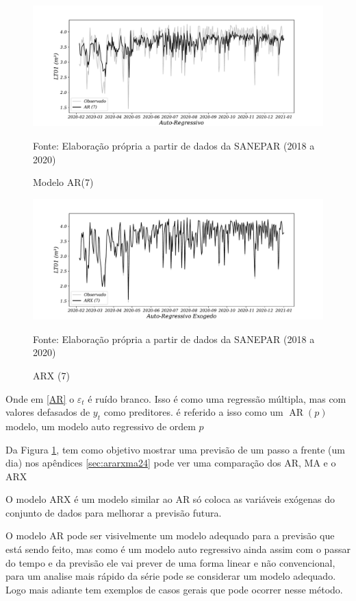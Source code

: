\begin{figure}[H]
	\centering
	\caption{Modelo AR(7)  }
	\label{fig:1-ar}
	\includegraphics[width=1\linewidth]{Modelos/Figuras/0-AR}
	
	Fonte: Elaboração própria a partir de dados da SANEPAR (2018 a 2020)
\end{figure}

\begin{figure}[H]
	\centering
	\caption{ARX (7)}
	\label{fig:1-arx}
	\includegraphics[width=1\linewidth]{Modelos/Figuras/0-ARX}
	
	Fonte: Elaboração própria a partir de dados da SANEPAR (2018 a 2020)
\end{figure}



Onde em \eqref{AR} o $\varepsilon_t$ é ruído branco. Isso é como uma regressão múltipla, mas com valores defasados de $y_t$ como preditores. é referido a isso como um $\operatorname{AR}(p)$ modelo, um modelo auto regressivo de ordem $p$

Da Figura \ref{fig:1-ar}, tem como objetivo mostrar uma previsão de um passo a frente (um dia) nos apêndices \ref{sec:ararxma24} pode ver uma comparação dos AR, MA e o ARX

O modelo ARX é um modelo similar ao AR só coloca as variáveis exógenas do conjunto de dados para melhorar a previsão futura.

O modelo AR pode ser visivelmente um modelo adequado para a previsão que está sendo feito, mas como é um modelo auto regressivo ainda assim com o passar do tempo e da previsão ele vai prever de uma forma linear e não convencional, para um analise mais rápido da série pode se considerar um modelo adequado. Logo mais adiante tem exemplos de casos gerais que pode ocorrer nesse método.

